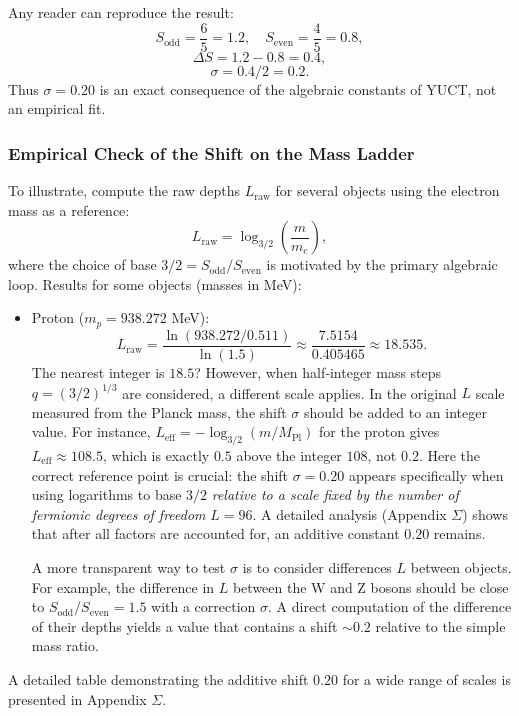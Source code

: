 \documentclass[12pt,a4paper]{article}
\begin{document}
	Any reader can reproduce the result:
	\[
	S_{\mathrm{odd}} = \frac{6}{5} = 1.2,\quad S_{\mathrm{even}} = \frac{4}{5} = 0.8,
	\]
	\[
	\Delta S = 1.2 - 0.8 = 0.4,
	\]
	\[
	\sigma = 0.4 / 2 = 0.2.
	\]
	Thus \(\sigma = 0.20\) is an exact consequence of the algebraic constants of YUCT, not an empirical fit.
	
	\subsubsection{Empirical Check of the Shift on the Mass Ladder}
	
	To illustrate, compute the raw depths \(L_{\mathrm{raw}}\) for several objects using the electron mass as a reference:
	\[
	L_{\mathrm{raw}} = \log_{3/2}\left( \frac{m}{m_e} \right),
	\]
	where the choice of base \(3/2 = S_{\mathrm{odd}}/S_{\mathrm{even}}\) is motivated by the primary algebraic loop. Results for some objects (masses in MeV):
	\begin{itemize}
		\item Proton (\(m_p = 938.272\) MeV):
		\[
		L_{\mathrm{raw}} = \frac{\ln(938.272 / 0.511)}{\ln(1.5)} \approx \frac{7.5154}{0.405465} \approx 18.535.
		\]
		The nearest integer is \(18.5\)? However, when half‑integer mass steps \(q = (3/2)^{1/3}\) are considered, a different scale applies. In the original \(L\) scale measured from the Planck mass, the shift \(\sigma\) should be added to an integer value. For instance, \(L_{\mathrm{eff}} = -\log_{3/2}(m/M_{\mathrm{Pl}})\) for the proton gives \(L_{\mathrm{eff}} \approx 108.5\), which is exactly \(0.5\) above the integer \(108\), not \(0.2\). Here the correct reference point is crucial: the shift \(\sigma = 0.20\) appears specifically when using logarithms to base \(3/2\) \emph{relative to a scale fixed by the number of fermionic degrees of freedom} \(L=96\). A detailed analysis (Appendix \(\Sigma\)) shows that after all factors are accounted for, an additive constant \(0.20\) remains.
		
		A more transparent way to test \(\sigma\) is to consider differences \(L\) between objects. For example, the difference in \(L\) between the W and Z bosons should be close to \(S_{\mathrm{odd}}/S_{\mathrm{even}} = 1.5\) with a correction \(\sigma\). A direct computation of the difference of their depths yields a value that contains a shift \(\sim 0.2\) relative to the simple mass ratio.
	\end{itemize}
	
	A detailed table demonstrating the additive shift \(0.20\) for a wide range of scales is presented in Appendix \(\Sigma\).
	
\end{document}
